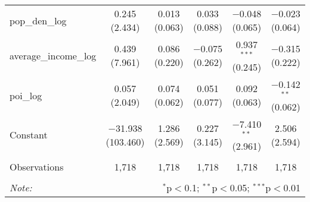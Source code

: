 \begin{table}[!htbp]
\begin{tabular}{@{\extracolsep{1pt}}lccccc}
  pop\_den\_log & 0.245 (2.434) & 0.013 (0.063) & 0.033 (0.088) & $-$0.048 (0.065) & $-$0.023 (0.064) \\ 
  average\_income\_log & 0.439 (7.961) & 0.086 (0.220) & $-$0.075 (0.262) & 0.937$^{***}$ (0.245) & $-$0.315 (0.222) \\ 
  poi\_log & 0.057 (2.049) & 0.074 (0.062) & 0.051 (0.077) & 0.092 (0.063) & $-$0.142$^{**}$ (0.062) \\ 
  Constant & $-$31.938 (103.460) & 1.286 (2.569) & 0.227 (3.145) & $-$7.410$^{**}$ (2.961) & 2.506 (2.594) \\ 
 \hline \\[-1.8ex] 
Observations & 1,718 & 1,718 & 1,718 & 1,718 & 1,718 \\ 
\hline 
\hline \\[-1.8ex] 
\textit{Note:}  & \multicolumn{5}{r}{$^{*}$p$<$0.1; $^{**}$p$<$0.05; $^{***}$p$<$0.01} \\ 
\end{tabular} 
\end{table} 
